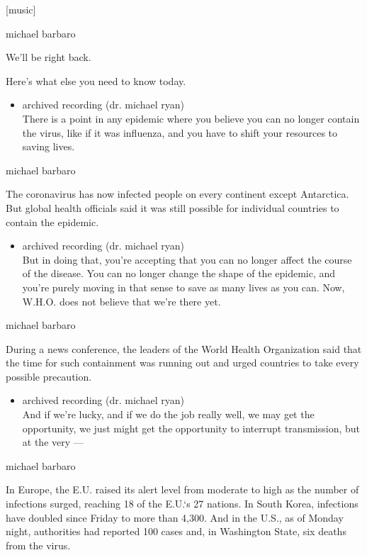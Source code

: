 {[}music{]}

michael barbaro

We'll be right back.

Here's what else you need to know today.

\begin{itemize}
\tightlist
\item
  archived recording (dr. michael ryan)\\
  There is a point in any epidemic where you believe you can no longer
  contain the virus, like if it was influenza, and you have to shift
  your resources to saving lives.
\end{itemize}

michael barbaro

The coronavirus has now infected people on every continent except
Antarctica. But global health officials said it was still possible for
individual countries to contain the epidemic.

\begin{itemize}
\tightlist
\item
  archived recording (dr. michael ryan)\\
  But in doing that, you're accepting that you can no longer affect the
  course of the disease. You can no longer change the shape of the
  epidemic, and you're purely moving in that sense to save as many lives
  as you can. Now, W.H.O. does not believe that we're there yet.
\end{itemize}

michael barbaro

During a news conference, the leaders of the World Health Organization
said that the time for such containment was running out and urged
countries to take every possible precaution.

\begin{itemize}
\tightlist
\item
  archived recording (dr. michael ryan)\\
  And if we're lucky, and if we do the job really well, we may get the
  opportunity, we just might get the opportunity to interrupt
  transmission, but at the very ---
\end{itemize}

michael barbaro

In Europe, the E.U. raised its alert level from moderate to high as the
number of infections surged, reaching 18 of the E.U.`s 27 nations. In
South Korea, infections have doubled since Friday to more than 4,300.
And in the U.S., as of Monday night, authorities had reported 100 cases
and, in Washington State, six deaths from the virus.

